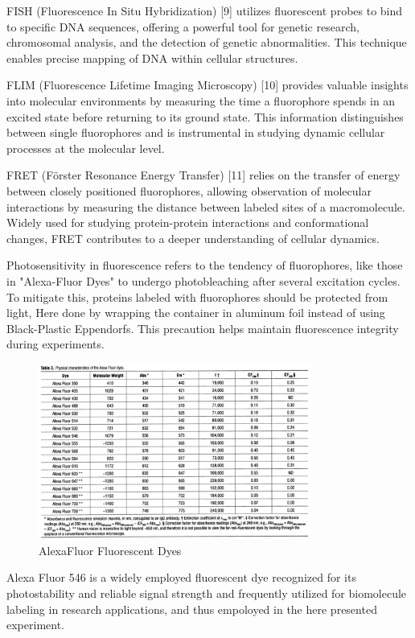 \documentclass[a4paper,english,12pt,bibliography=totoc]{scrreprt}
\begin{document}
FISH (Fluorescence In Situ Hybridization) [9] utilizes fluorescent probes to bind to specific DNA sequences, offering a powerful tool for genetic research, chromosomal analysis, and the detection of genetic abnormalities. This technique enables precise mapping of DNA within cellular structures.
\newline

FLIM (Fluorescence Lifetime Imaging Microscopy) [10] provides valuable insights into molecular environments by measuring the time a fluorophore spends in an excited state before returning to its ground state. This information distinguishes between single fluorophores and is instrumental in studying dynamic cellular processes at the molecular level.
\newline

FRET (Förster Resonance Energy Transfer) [11] relies on the transfer of energy between closely positioned fluorophores, allowing observation of molecular interactions by measuring the distance between labeled sites of a  macromolecule. Widely used for studying protein-protein interactions and conformational changes, FRET contributes to a deeper understanding of cellular dynamics.
\newline

Photosensitivity in fluorescence refers to the tendency of fluorophores, like those in "Alexa-Fluor Dyes" to undergo photobleaching after several excitation cycles. To mitigate this, proteins labeled with fluorophores should be protected from light, Here done by wrapping the container in aluminum foil instead of using Black-Plastic Eppendorfs. This precaution helps maintain fluorescence integrity during experiments.
\newline
\begin{figure}[H]
    \centering
    \includegraphics[width=0.8\textwidth]{alexafluordyes.png}
    \caption{AlexaFluor Fluorescent Dyes}
    \label{fig:ViolinPlot}
\end{figure}
Alexa Fluor 546 is a widely employed fluorescent dye recognized for its photostability and reliable signal strength and frequently utilized for biomolecule labeling in research applications, and thus empoloyed in the here presented experiment.
\end{document}
